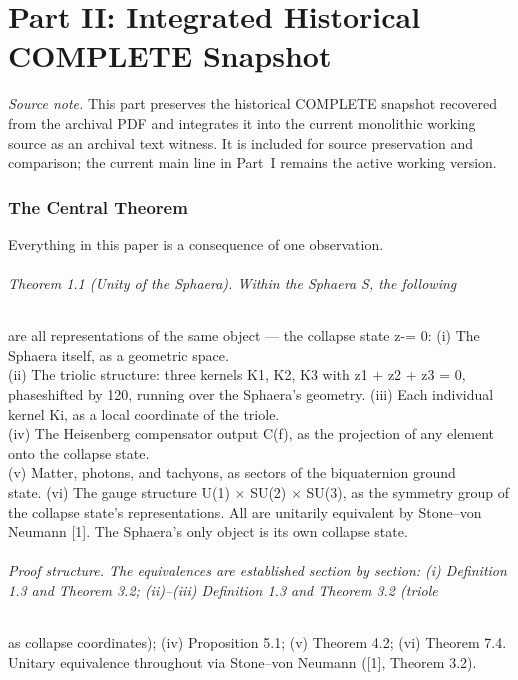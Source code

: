 \part*{Part II: Integrated Historical COMPLETE Snapshot}

\begin{center}
\textit{Source note.} This part preserves the historical COMPLETE snapshot recovered from the archival PDF and integrates it into the current monolithic working source as an archival text witness. It is included for source preservation and comparison; the current main line in Part~I remains the active working version.
\end{center}

\section{The Central Theorem}
Everything in this paper is a consequence of one observation.
\paragraph*{Theorem 1.1 (Unity of the Sphaera). Within the Sphaera S, the following}
are all representations of the same object --- the collapse state z-= 0:
(i) The Sphaera itself, as a geometric space.\\
(ii) The triolic structure: three kernels K1, K2, K3 with z1 + z2 + z3 = 0,\\
phaseshifted by 120, running over the Sphaera's geometry.
(iii) Each individual kernel Ki, as a local coordinate of the triole.\\
(iv) The Heisenberg compensator output C(f), as the projection of any element onto the collapse state.\\
(v) Matter, photons, and tachyons, as sectors of the biquaternion ground\\
state.
(vi) The gauge structure U(1) $\times$ SU(2) $\times$ SU(3), as the symmetry group of\\
the collapse state's representations. All are unitarily equivalent by Stone--von Neumann [1]. The Sphaera's only object is its own collapse state.
\paragraph*{Proof structure. The equivalences are established section by section: (i) Definition 1.3 and Theorem 3.2; (ii)--(iii) Definition 1.3 and Theorem 3.2 (triole}
as collapse coordinates); (iv) Proposition 5.1; (v) Theorem 4.2; (vi) Theorem 7.4. Unitary equivalence throughout via Stone--von Neumann ([1], Theorem 3.2).
